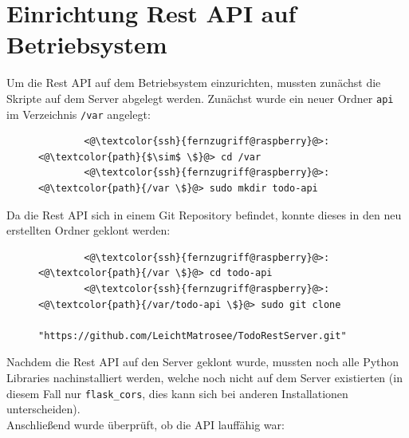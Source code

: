 \documentclass[a4paper, 11pt]{scrartcl}
\begin{document}
\section{Einrichtung Rest API auf Betriebsystem}
Um die Rest API auf dem Betriebsystem einzurichten, mussten zunächst die Skripte auf dem Server abgelegt werden. Zunächst wurde
ein neuer Ordner \lstinline[basicstyle={\small\ttfamily\color{black}}]|api| im Verzeichnis \lstinline[basicstyle={\small\ttfamily\color{black}}]|/var|
angelegt:
\begin{figure}[H]
    \begin{mdframed}[backgroundcolor=bbg]
        \begin{lstlisting}
        <@\textcolor{ssh}{fernzugriff@raspberry}@>:<@\textcolor{path}{$\sim$ \$}@> cd /var
        <@\textcolor{ssh}{fernzugriff@raspberry}@>:<@\textcolor{path}{/var \$}@> sudo mkdir todo-api
        \end{lstlisting}
    \end{mdframed}
    \label{lst:api_folder}
\end{figure}
Da die Rest API sich in einem Git Repository befindet, konnte dieses in den neu erstellten Ordner geklont werden:
\begin{figure}[H]
    \begin{mdframed}[backgroundcolor=bbg]
        \begin{lstlisting}
        <@\textcolor{ssh}{fernzugriff@raspberry}@>:<@\textcolor{path}{/var \$}@> cd todo-api
        <@\textcolor{ssh}{fernzugriff@raspberry}@>:<@\textcolor{path}{/var/todo-api \$}@> sudo git clone 
                "https://github.com/LeichtMatrosee/TodoRestServer.git"
        \end{lstlisting}
    \end{mdframed}
    \label{lst:api_folder}
\end{figure}
Nachdem die Rest API auf den Server geklont wurde, mussten noch alle Python Libraries nachinstalliert werden, welche noch nicht
auf dem Server existierten (in diesem Fall nur \lstinline[basicstyle={\small\ttfamily\color{black}}]|flask_cors|, dies kann
sich bei anderen Installationen unterscheiden).
\\
Anschließend wurde überprüft, ob die API lauffähig war:
\end{document}
